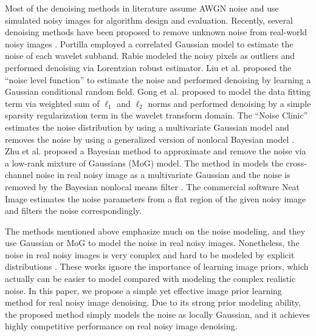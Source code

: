 Most of the denoising methods in literature \cite{bayesshrink,curvelet,ksvd,lssc,ncsr,bm3d,cbm3d,
zhou2012nonparametric,Tomasi1998,blsgsm,nlm,nlbayes,wnnm,pgpd,foe,epll,
mlp,xie2012image,dncnn,barbu2009training,csf,chen2015learning} assume AWGN noise and use simulated noisy images for algorithm design and evaluation. Recently, several denoising methods have been proposed to remove unknown noise from real-world noisy images \cite{fullyblind,rabie2005robust,Liu2008,almapg,crosschannel2016,Zhu_2016_CVPR,noiseclinic,ncwebsite}. Portilla \cite{fullyblind} employed a correlated Gaussian model to estimate the noise of each wavelet subband. Rabie \cite{rabie2005robust} modeled the noisy pixels as outliers and performed denoising via Lorentzian robust estimator. Liu et al. \cite{Liu2008} proposed the ``noise level function'' to estimate the noise and performed denoising by learning a Gaussian conditional random field. Gong et al. \cite{almapg} proposed to model the data fitting term via weighted sum of $\ell_{1}$ and $\ell_{2}$ norms and performed denoising by a simple sparsity regularization term in the wavelet transform domain. The ``Noise Clinic'' \cite{noiseclinic,ncwebsite} estimates the noise distribution by using a multivariate Gaussian model and removes the noise by using a generalized version of nonlocal Bayesian model \cite{nlbayes}. Zhu et al. \cite{Zhu_2016_CVPR} proposed a Bayesian method to approximate and remove the noise via a low-rank mixture of Gaussians (MoG) model. The method in \cite{crosschannel2016} models the cross-channel noise in real noisy image as a multivariate Gaussian and the noise is removed by the Bayesian nonlocal means filter \cite{kervrann2007bayesian}. The commercial software Neat Image \cite{neatimage} estimates the noise parameters from a flat region of the given noisy image and filters the noise correspondingly. 


The methods \cite{fullyblind,rabie2005robust,Liu2008,almapg,crosschannel2016,Zhu_2016_CVPR,noiseclinic,ncwebsite} mentioned above emphasize much on the noise modeling, and they use Gaussian or MoG to model the noise in real noisy images. Nonetheless, the noise in real noisy images is very complex and hard to be modeled by explicit distributions \cite{healey1994radiometric}. These works ignore the importance of learning image priors, which actually can be easier to model compared with modeling the complex realistic noise. In this paper, we propose a simple yet effective image prior learning method for real noisy image denoising. Due to its strong prior modeling ability, the proposed method simply models the noise as locally Gaussian, and it achieves highly competitive performance on real noisy image denoising.


